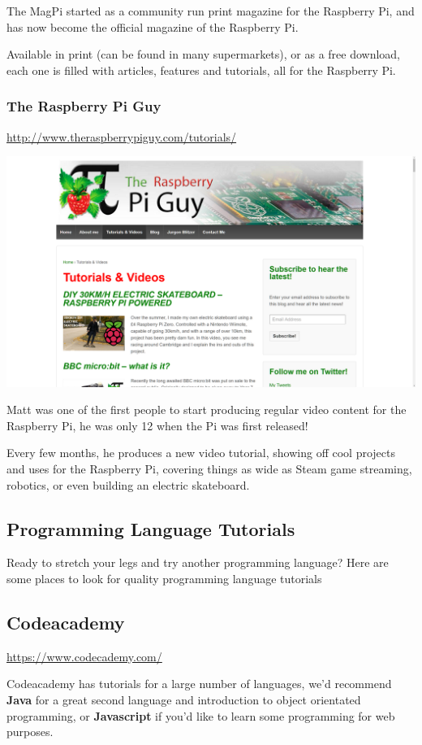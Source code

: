 			The MagPi started as a community run print magazine for the Raspberry Pi, and has now become the official magazine of the Raspberry Pi.
			
			Available in print (can be found in many supermarkets), or as a free download, each one is filled with articles, features and tutorials, all for the Raspberry Pi.
			
		\subsubsection*{The Raspberry Pi Guy}
			
			\url{http://www.theraspberrypiguy.com/tutorials/}
			\begin{center}
				\includegraphics[width=0.5\linewidth]{000_IntroToPi/4_Resources/piguy}
			\end{center}	
			
			Matt was one of the first people to start producing regular video content for the Raspberry Pi, he was only 12 when the Pi was first released!
			
			Every few months, he produces a new video tutorial, showing off cool projects and uses for the Raspberry Pi, covering things as wide as Steam game streaming, robotics, or even building an electric skateboard.
		
	\subsection{Programming Language Tutorials}
	
		Ready to stretch your legs and try another programming language? Here are some places to look for quality programming language tutorials
		
		\subsection*{Codeacademy}
		
		\url{https://www.codecademy.com/}
		
		Codeacademy has tutorials for a large number of languages, we'd recommend \textbf{Java} for a great second language and introduction to object orientated programming, or \textbf{Javascript} if you'd like to learn some programming for web purposes.
		
